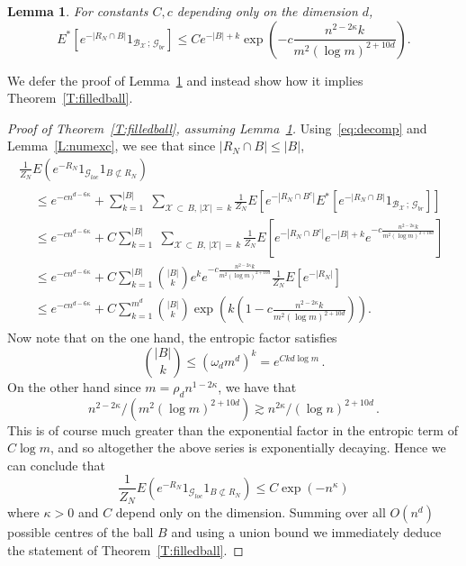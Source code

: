 \documentclass[10pt]{amsart}
\newtheorem{lemm}[theo]{Lemma}\newtheorem{prop}[theo]{Proposition}\newtheorem{coro}[theo]{Corollary}\newtheorem{conj}[theo]{Conjecture}
\theoremstyle{definition}\newtheorem{defi}[theo]{Definition}\newtheorem{rema}[theo]{Remark}\newtheorem{exam}[theo]{Example}\newtheorem{exem}[theo]{Example}\newtheorem{nota}[theo]{Notation}
\newcommand*\E {{E}}
\newcommand{\cB}{\mathcal{B}}
\newcommand{\cG}{\mathcal{G}}
\newcommand{\cX}{\mathcal{X}}
\begin{document}
\begin{lemm}
For constants $C,c$ depending only on the dimension $d$,\label{L:badmiss}
\[
\E^*\left[e^{- | R_N\cap B| }1_{\cB_{\cX}\,;\,\cG_{br}} \right] \le Ce^{- |B| +k} \exp\left(- c \frac{n^{2 - 2\kappa} k}{ m^2(\log m)^{2+ 10d}}\right).
\]
\end{lemm}

We defer the proof of Lemma~\ref{L:badmiss} and instead show how it implies Theorem~\ref{T:filledball}.

\begin{proof}[Proof of Theorem~\ref{T:filledball}, assuming Lemma~\ref{L:badmiss}]
Using~\eqref{eq:decomp} and Lemma~\ref{L:numexc}, we see that since $|R_N\cap B| \le |B|$,
\begin{multline*}
\frac1{Z_N} \E\left(e^{ - R_N} 1_{ \cG_{loc}} 1_{B \not \subset R_N}\right) \\
\begin{aligned}
& \le e^{- cn^{d- 6\kappa}}+ \sum_{k=1}^{|B|}\; \sum_{\cX\,\subset\,B,\,|\cX|\,=\,k} \frac1{Z_N} \E\left[e^{ - |R_N\cap B^c|} \E^*\left[e^{- | R_N \cap B| }1_{\cB_{\cX}\,;\, \cG_{br}}\right] \right]
\\
& \le e^{ - cn^{d-6 \kappa }} + C\sum_{k=1}^{|B|}\;\sum_{\cX\,\subset\,B,\,|\cX|\,=\,k} \frac{1}{Z_N} \E\left[e^{ - |R_N\cap B^c|} e^{- |B| +k} e^{- c \frac{n^{2- 2\kappa} k}{ m^2(\log m)^{2+ 10d}} }\right]\\
& \le e^{ - cn^{d-6 \kappa}} + C \sum_{k=1}^{|B|} \binom{|B|}{k} e^k e^{- c \frac{n^{2- 2\kappa} k}{ m^2(\log m)^{2+ 10d}} } \frac{1}{Z_N} \E\left[e^{ - |R_N|}\right]\\
& \le e^{ - cn^{d-6 \kappa}} + C \sum_{k=1}^{m^d}\binom{|B|}{k} \exp\left(k (1 - c\frac{n^{2- 2\kappa} k}{ m^2(\log m)^{2+ 10d}})\right).
\end{aligned}
\end{multline*}
Now note that on the one hand, the entropic factor satisfies
\[
\binom{|B|}{k} \le (\omega_d m^{d})^k = e^{ C k d\log m}\,.
\]
On the other hand since $m = \rho_d n^{1-2\kappa}$, we have that
\[
n^{2 - 2\kappa} / \left(m^2 (\log m)^{2+ 10d}\right) \gtrsim n^{2\kappa}/(\log n)^{2+ 10d}\,.
\]
This is of course much greater than the exponential factor in the entropic term of $C \log m$, and so altogether the above series is exponentially decaying. Hence we can conclude that
\[
\frac1{Z_N}\E\left(e^{ - R_N} 1_{ \cG_{loc}} 1_{B \not \subset R_N}\right) \le C \exp(- n^{\kappa})
\]
where $\kappa>0$ and $C$ depend only on the dimension. Summing over all $O(n^d)$ possible centres of the ball $B$ and using a union bound we immediately deduce the statement of Theorem~\ref{T:filledball}.
\end{proof}
\end{document}
